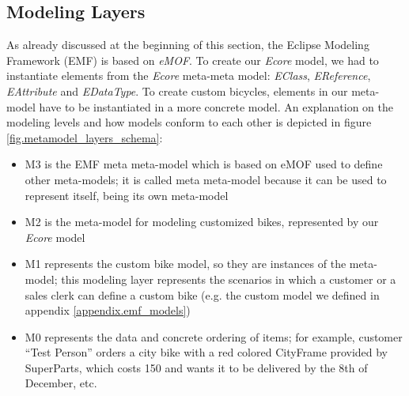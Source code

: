 \subsection{Modeling Layers}
\noindent As already discussed at the beginning of this section, the Eclipse
Modeling Framework (EMF) is based on \emph{eMOF}. To create our \emph{Ecore} model,
we had to instantiate elements from the \emph{Ecore} meta-meta model:
\emph{EClass}, \emph{EReference}, \emph{EAttribute} and \emph{EDataType}. To create custom
bicycles, elements in our meta-model have to be instantiated in a more concrete
model. An explanation on the modeling levels and how models conform to each
other is depicted in figure \ref{fig.metamodel_layers_schema}:
\begin{itemize}
  \item{M3} is the EMF meta meta-model which is based on eMOF used to
  define other meta-models; it is called meta meta-model because it can be used to
  represent itself, being its own meta-model
  \item{M2} is the meta-model for modeling customized bikes, represented by
  our \emph{Ecore} model
  \item{M1} represents the custom bike model, so they are instances of the
  meta-model; this modeling layer represents the scenarios in which a customer
  or a sales clerk can define a custom bike (e.g. the custom model we defined
  in appendix \ref{appendix.emf_models})
  \item{M0} represents the data and concrete ordering of items; for example,
  customer ``Test Person'' orders a city bike with a red colored CityFrame
  provided by SuperParts, which costs 150 and wants it to be delivered by the
  8th of December, etc.
\end{itemize} 
